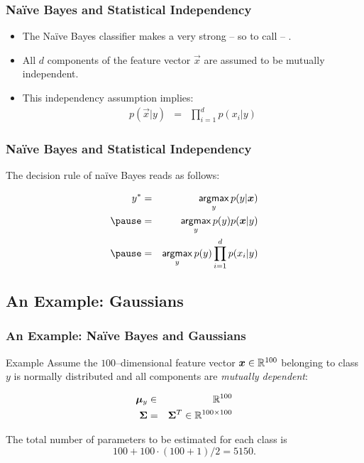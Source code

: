  
\begin{frame} 
  \frametitle{Na{\"i}ve Bayes and Statistical Independency \cont}
  
  \begin{itemize}
    \item The Na{\"i}ve Bayes classifier makes a very strong -- so to call  -- . \\[.5cm]
    \item All $d$ components of the feature vector $\vec x$ are assumed to be mutually independent. \\[.5cm] \pause
    \item This independency assumption implies:
      \begin{eqnarray*}
        p(\vec x| y) &=& \prod_{i=1}^d p(x_i|y)
      \end{eqnarray*}
  \end{itemize}
\end{frame}


\begin{frame}
  \frametitle{Na{\"i}ve Bayes and Statistical Independency \cont}

  The decision rule of na{\"i}ve Bayes reads as follows:

  \begin{eqnarray*}
     y^*  &=& \argmax\limits_{y} p(y|\vec x) \\ \pause
          &=& \argmax\limits_{y} p(y) p(\vec x| y) \\ \pause
          &=& \argmax\limits_{y} p(y) \prod_{i=1}^d p(x_i | y)
   \end{eqnarray*}
\end{frame}
 

\subsection{An Example: Gaussians}

\begin{frame}
  \frametitle{An Example: Na{\"i}ve Bayes and Gaussians}

  \begin{ovalblock}{Example} 
    Assume the $100$--dimensional feature vector ${\bm x}\in \mathbb{R}^{100}$ belonging to class $y$ is normally distributed and all components are {\em mutually dependent}:
 
    \begin{eqnarray*}
      {\bm \mu}_y &\in& \mathbb{R}^{100} \\
      {\bm \Sigma} &=&  {\bm \Sigma}^T \in \mathbb{R}^{100\times 100} 
    \end{eqnarray*}
 
    The total number of parameters to be estimated for each class is \pause $$100+100\cdot (100+1)/2= 5150.$$
  \end{ovalblock}
\end{frame}



